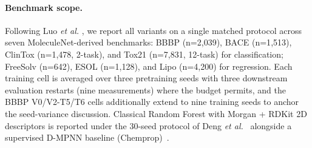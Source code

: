 \paragraph{Benchmark scope.}
Following Luo \emph{et al.} \cite{luo2024classicgnn}, we report all
variants on a single matched protocol across seven MoleculeNet-derived
benchmarks: BBBP (n=2{,}039), BACE (n=1{,}513), ClinTox (n=1{,}478,
2-task), and Tox21 (n=7{,}831, 12-task) for classification; FreeSolv
(n=642), ESOL (n=1{,}128), and Lipo (n=4{,}200) for regression. Each
training cell is averaged over three pretraining seeds with three
downstream evaluation restarts (nine measurements) where the budget
permits, and the BBBP V0/V2-T5/T6 cells additionally extend to nine
training seeds to anchor the seed-variance discussion. Classical Random
Forest with Morgan + RDKit 2D descriptors is reported under the 30-seed
protocol of Deng \emph{et al.}~\cite{deng2023systematic} alongside a
supervised D-MPNN baseline (Chemprop)~\cite{yang2019chemprop}.

